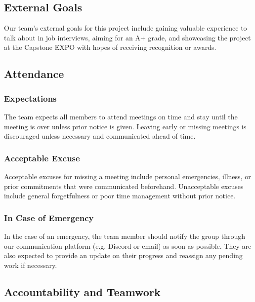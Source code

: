 \documentclass{article}
\begin{document}

\subsection*{External Goals}

Our team’s external goals for this project include gaining valuable experience to talk
about in job interviews, aiming for an A+ grade, and showcasing the project at the Capstone
EXPO with hopes of receiving recognition or awards.

\subsection*{Attendance}

\subsubsection*{Expectations}

The team expects all members to attend meetings on time and stay until the meeting is over
unless prior notice is given. Leaving early or missing meetings is discouraged unless 
necessary and communicated ahead of time.

\subsubsection*{Acceptable Excuse}

Acceptable excuses for missing a meeting include personal emergencies, illness, or prior
commitments that were communicated beforehand. Unacceptable excuses include general
forgetfulness or poor time management without prior notice.

\subsubsection*{In Case of Emergency}

In the case of an emergency, the team member should notify the group through our communication
platform (e.g. Discord or email) as soon as possible. They are also expected to provide an update
on their progress and reassign any pending work if necessary.

\subsection*{Accountability and Teamwork}
\end{document}
